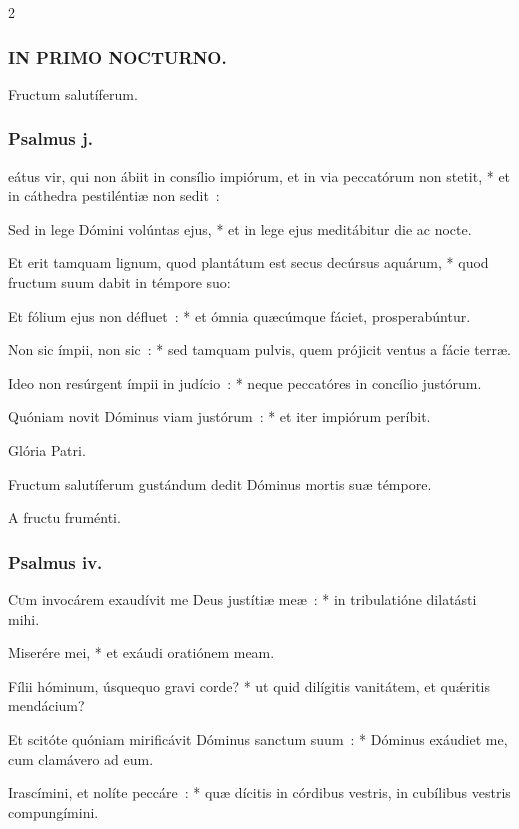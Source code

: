\documentclass[9pt,twoside]{extarticle}
\begin{document}
\begin{multicols}{2}
{{\subsubsection*{\center \textsc{IN PRIMO NOCTURNO.}}
 Fructum salutíferum.
\subsubsection*{\center Psalmus j.}
eátus vir, qui non ábiit in consílio impiórum, et in via peccatórum non stetit, * et in cáthedra pestiléntiæ non sedit~:

Sed in lege Dómini volúntas ejus, * et in lege ejus meditábitur die ac nocte.

Et erit tamquam lignum, quod plantátum est secus decúrsus aquárum, * quod fructum suum dabit in témpore suo:

Et fólium ejus non défluet~: * et ómnia quæcúmque fáciet, prosperabúntur.

Non sic ímpii, non sic~: * sed tamquam pulvis, quem prójicit ventus a fácie terræ.

Ideo non resúrgent ímpii in judício~: * neque peccatóres in concílio justórum.

Quóniam novit Dóminus viam justórum~: * et iter impiórum períbit.

Glória Patri.

\begin{tightlist}{}
\item {} Fructum salutíferum gustándum dedit Dóminus mortis suæ témpore.
\item {} A fructu fruménti.
\end{tightlist}

\subsubsection*{\center Psalmus iv.}
\lettrine{C}um invocárem exaudívit me Deus justítiæ meæ~: * in tribulatióne dilatásti mihi.

Miserére mei, * et exáudi oratiónem meam.

Fílii hóminum, úsquequo gravi corde? * ut quid dilígitis vanitátem, et quǽritis mendácium?

Et scitóte quóniam mirificávit Dóminus sanctum suum~: * Dóminus exáudiet me, cum clamávero ad eum.

Irascímini, et nolíte peccáre~: * quæ dícitis in córdibus vestris, in cubílibus vestris compungímini.

}}
\end{multicols}
\end{document}

